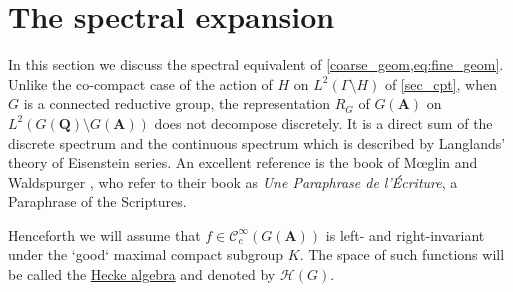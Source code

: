 \documentclass[11pt]{amsart}
\def\A{\mathbf A}
\def\Q{\mathbf Q}
\def\CCC{\mathcal C}
\def\HHH{\mathcal H}
\def\bs{\setminus}
\def\Ltwo{L^2}
\theoremstyle{remark}
\begin{document}
\section{The spectral expansion} \label{sec:spec}

In this section we discuss the spectral equivalent of \cref{coarse_geom,eq:fine_geom}. Unlike the co-compact case of the action of $H$ on $\Ltwo(\Gamma \bs H)$ of \cref{sec_cpt}, when $G$ is a connected reductive group, the representation $R_G$ of $G(\A)$ on $\Ltwo(G(\Q)\bs G(\A))$ does not decompose discretely. It is a direct sum of the discrete spectrum and the continuous spectrum which is described by Langlands' theory of Eisenstein series. An excellent reference is the book of M{\oe}glin and Waldspurger \cite{MW}, who refer to their book as \textit{Une Paraphrase de l'\'{E}criture}, a Paraphrase of the Scriptures. 

Henceforth we will assume that $f \in \CCC^\infty_c(G(\A))$ is left- and right-invariant under the `good` maximal compact subgroup $K$. The space of such functions will be called the \underline{Hecke algebra} and denoted by $\HHH(G)$.
\end{document}
